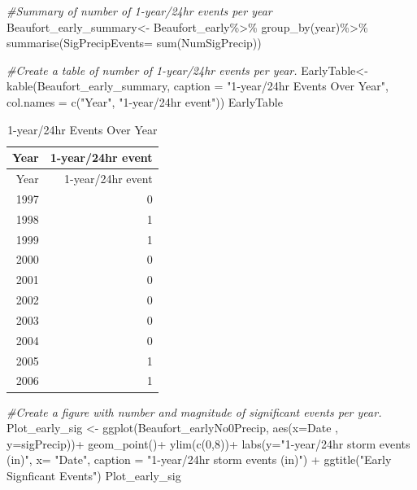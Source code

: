 \documentclass[
  12pt,
]{article}
\newenvironment{Shaded}{\begin{snugshade}}{\end{snugshade}}
\newcommand{\AttributeTok}[1]{\textcolor[rgb]{0.77,0.63,0.00}{#1}}
\newcommand{\CommentTok}[1]{\textcolor[rgb]{0.56,0.35,0.01}{\textit{#1}}}
\newcommand{\DecValTok}[1]{\textcolor[rgb]{0.00,0.00,0.81}{#1}}
\newcommand{\FunctionTok}[1]{\textcolor[rgb]{0.00,0.00,0.00}{#1}}
\newcommand{\NormalTok}[1]{#1}
\newcommand{\OtherTok}[1]{\textcolor[rgb]{0.56,0.35,0.01}{#1}}
\newcommand{\SpecialCharTok}[1]{\textcolor[rgb]{0.00,0.00,0.00}{#1}}
\newcommand{\StringTok}[1]{\textcolor[rgb]{0.31,0.60,0.02}{#1}}
\begin{document}
\begin{Shaded}
\begin{Highlighting}[]
\CommentTok{\#Summary of number of 1{-}year/24hr events per year}
\NormalTok{Beaufort\_early\_summary}\OtherTok{\textless{}{-}}\NormalTok{ Beaufort\_early}\SpecialCharTok{\%\textgreater{}\%}
  \FunctionTok{group\_by}\NormalTok{(year)}\SpecialCharTok{\%\textgreater{}\%}
  \FunctionTok{summarise}\NormalTok{(}\AttributeTok{SigPrecipEvents=} \FunctionTok{sum}\NormalTok{(NumSigPrecip))}

\CommentTok{\#Create a table of number of 1{-}year/24hr events per year.}
\NormalTok{EarlyTable}\OtherTok{\textless{}{-}} \FunctionTok{kable}\NormalTok{(Beaufort\_early\_summary, }
                   \AttributeTok{caption =} \StringTok{"1{-}year/24hr Events Over Year"}\NormalTok{, }
                   \AttributeTok{col.names =} \FunctionTok{c}\NormalTok{(}\StringTok{"Year"}\NormalTok{, }\StringTok{"1{-}year/24hr event"}\NormalTok{))}
\NormalTok{EarlyTable}
\end{Highlighting}
\end{Shaded}

\begin{longtable}[]{@{}rr@{}}
\caption{1-year/24hr Events Over Year}\tabularnewline
\toprule
Year & 1-year/24hr event \\
\midrule
\endfirsthead
\toprule
Year & 1-year/24hr event \\
\midrule
\endhead
1997 & 0 \\
1998 & 1 \\
1999 & 1 \\
2000 & 0 \\
2001 & 0 \\
2002 & 0 \\
2003 & 0 \\
2004 & 0 \\
2005 & 1 \\
2006 & 1 \\
\bottomrule
\end{longtable}

\begin{Shaded}
\begin{Highlighting}[]
\CommentTok{\#Create a figure with number and magnitude of significant events per year.}
\NormalTok{Plot\_early\_sig }\OtherTok{\textless{}{-}} \FunctionTok{ggplot}\NormalTok{(Beaufort\_earlyNo0Precip, }
                         \FunctionTok{aes}\NormalTok{(}\AttributeTok{x=}\NormalTok{Date , }\AttributeTok{y=}\NormalTok{sigPrecip))}\SpecialCharTok{+}
  \FunctionTok{geom\_point}\NormalTok{()}\SpecialCharTok{+}
  \FunctionTok{ylim}\NormalTok{(}\FunctionTok{c}\NormalTok{(}\DecValTok{0}\NormalTok{,}\DecValTok{8}\NormalTok{))}\SpecialCharTok{+}
  \FunctionTok{labs}\NormalTok{(}\AttributeTok{y=}\StringTok{"1{-}year/24hr storm events (in)"}\NormalTok{, }\AttributeTok{x=} \StringTok{"Date"}\NormalTok{, }
       \AttributeTok{caption =} \StringTok{"1{-}year/24hr storm events (in)"}\NormalTok{) }\SpecialCharTok{+}
  \FunctionTok{ggtitle}\NormalTok{(}\StringTok{"Early Signficant Events"}\NormalTok{)}
\NormalTok{Plot\_early\_sig}
\end{Highlighting}
\end{Shaded}
\end{document}
